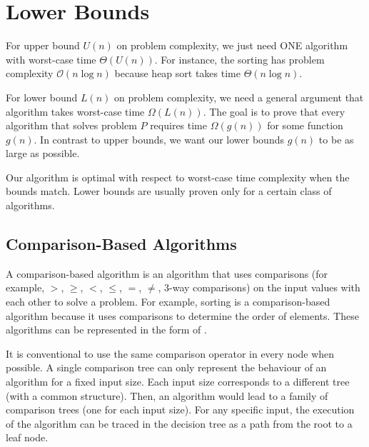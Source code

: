 \chapter{Lower Bounds}

For upper bound $U(n)$ on problem complexity, we just need ONE algorithm with worst-case time $\Theta(U(n))$. For instance, the sorting has problem complexity $\mathcal{O}(n \log n)$ because heap sort takes time $\Theta(n \log n)$.

For lower bound $L(n)$ on problem complexity, we need a general argument that  algorithm takes worst-case time $\Omega(L(n))$. The goal is to prove that every algorithm that solves problem $P$ requires time $\Omega(g(n))$ for some function $g(n)$. In contrast to upper bounds, we want our lower bounds $g(n)$ to be as large as possible.

Our algorithm is optimal with respect to worst-case time complexity when the bounds match. Lower bounds are usually proven only for a certain class of algorithms.

\section{Comparison-Based Algorithms}

A comparison-based algorithm is an algorithm that uses comparisons (for example, $>$, $\ge$, $<$, $\le$, $=$, $\neq$, 3-way comparisons) on the input values with each other to solve a problem. For example, sorting is a comparison-based algorithm because it uses comparisons to determine the order of elements. These algorithms can be represented in the form of . 

It is conventional to use the same comparison operator in every node when possible. A single comparison tree can only represent the behaviour of an algorithm for a fixed input size. Each input size corresponds to a different tree (with a common structure). Then, an algorithm would lead to a family of comparison trees (one for each input size). For any specific input, the execution of the algorithm can be traced in the decision tree as a path from the root to a leaf node.



